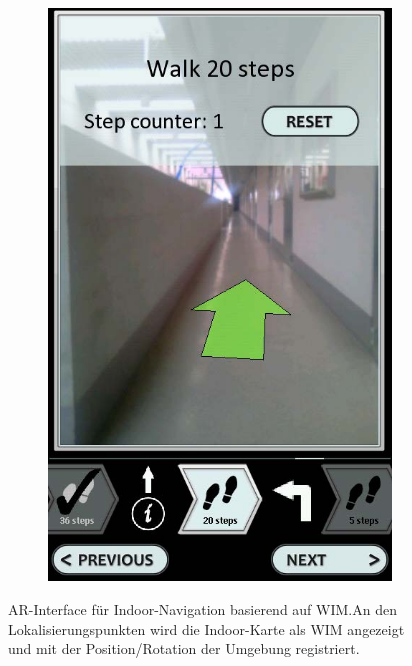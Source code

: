 \begin{figure}[t]
\begin{subfigure}{.18\textwidth}
        \includegraphics[width=\textwidth]{figures/mulloni2011_wim_e.png}
        \caption{}
        \label{sfig:mulloni2011_wim_e}
    \end{subfigure}
    \caption{AR-Interface für Indoor-Navigation basierend auf WIM.\@ An den Lokalisierungspunkten wird die Indoor-Karte als WIM angezeigt und mit der Position/Rotation der Umgebung registriert. }
    \label{fig:mulloni2011_wim}
\end{figure}

